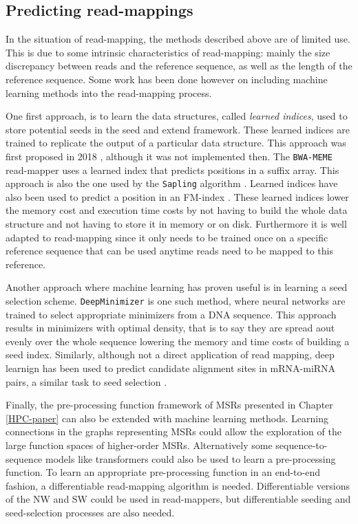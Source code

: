 \documentclass[
  11pt,
  twoside,
  BCOR=10mm,
  listof=totoc]{scrbook}
\begin{document}
\hypertarget{predicting-read-mappings}{%
\subsection{Predicting read-mappings}\label{predicting-read-mappings}}

In the situation of read-mapping, the methods described above are of limited use. This is due to some intrinsic characteristics of read-mapping: mainly the size discrepancy between reads and the reference sequence, as well as the length of the reference sequence. Some work has been done however on including machine learning methods into the read-mapping process.

One first approach, is to learn the data structures, called \emph{learned indices}, used to store potential seeds in the seed and extend framework. These learned indices are trained to replicate the output of a particular data structure. This approach was first proposed in 2018 \autocite{kraskaCaseLearnedIndex2018}, although it was not implemented then. The \texttt{BWA-MEME} \autocite{jungBWAMEMEBWAMEMEmulated2022} read-mapper uses a learned index that predicts positions in a suffix array. This approach is also the one used by the \texttt{Sapling} algorithm \autocite{kirscheSaplingAcceleratingSuffix2021}. Learned indices have also been used to predict a position in an FM-index \autocite{hoLISALearnedIndexes2021}. These learned indices lower the memory cost and execution time costs by not having to build the whole data structure and not having to store it in memory or on disk. Furthermore it is well adapted to read-mapping since it only needs to be trained once on a specific reference sequence that can be used anytime reads need to be mapped to this reference.

Another approach where machine learning has proven useful is in learning a seed selection scheme. \texttt{DeepMinimizer} \autocite{hoangDifferentiableLearningSequenceSpecific2022} is one such method, where neural networks are trained to select appropriate minimizers from a DNA sequence. This approach results in minimizers with optimal density, that is to say they are spread aout evenly over the whole sequence lowering the memory and time costs of building a seed index. Similarly, although not a direct application of read mapping, deep learnign has been used to predict candidate alignment sites in mRNA-miRNA pairs, a similar task to seed selection \autocite{minTargetNetFunctionalMicroRNA2022}.

Finally, the pre-processing function framework of MSRs presented in Chapter \ref{HPC-paper} can also be extended with machine learning methods. Learning connections in the graphs representing MSRs could allow the exploration of the large function spaces of higher-order MSRs. Alternatively some sequence-to-sequence models like transformers could also be used to learn a pre-processing function. To learn an appropriate pre-processing function in an end-to-end fashion, a differentiable read-mapping algorithm is needed. Differentiable versions of the NW and SW could be used in read-mappers, but differentiable seeding and seed-selection processes are also needed.
\end{document}
